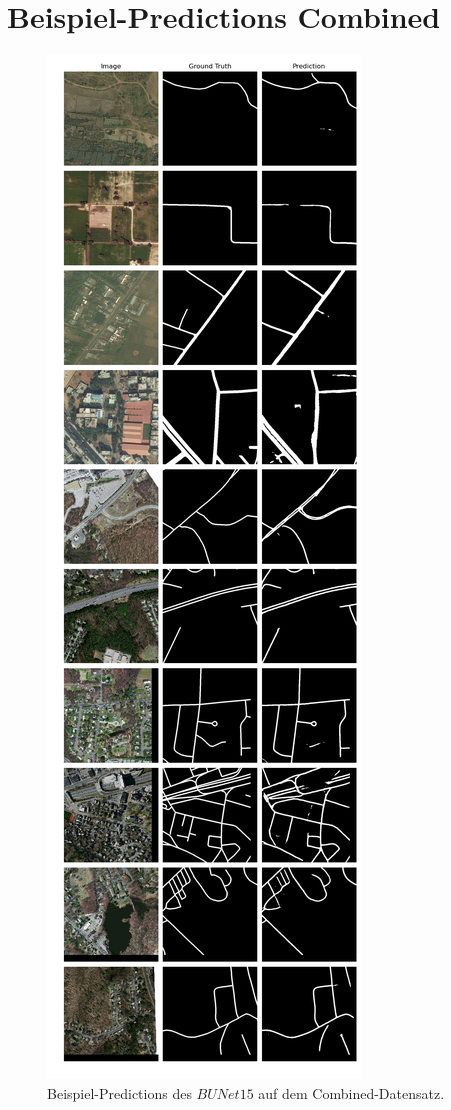 \pagebreak 

\section{Beispiel-Predictions Combined} \label{sec:pred-combined}


\begin{figure}
	\centering
	\includegraphics[width=.41\textwidth]{Bilder/Samples-Combined/bunet15.png}
	\caption{Beispiel-Predictions des $BUNet15$ auf dem Combined-Datensatz.}
	\label{fig:combined-samples-bunet15}
\end{figure}

